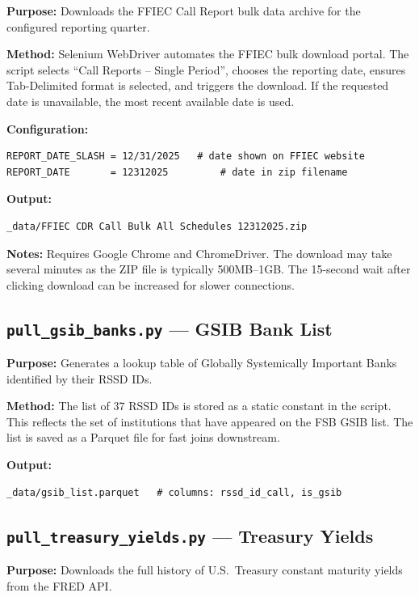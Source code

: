 \documentclass[12pt, a4paper]{article}
\begin{document}
\textbf{Purpose:} Downloads the FFIEC Call Report bulk data archive for the
configured reporting quarter.

\textbf{Method:} Selenium WebDriver automates the FFIEC bulk download portal.
The script selects ``Call Reports -- Single Period'', chooses the reporting date,
ensures Tab-Delimited format is selected, and triggers the download. If the
requested date is unavailable, the most recent available date is used.

\textbf{Configuration:}
\begin{lstlisting}
REPORT_DATE_SLASH = 12/31/2025   # date shown on FFIEC website
REPORT_DATE       = 12312025         # date in zip filename
\end{lstlisting}

\textbf{Output:}
\begin{lstlisting}
_data/FFIEC CDR Call Bulk All Schedules 12312025.zip
\end{lstlisting}

\textbf{Notes:} Requires Google Chrome and ChromeDriver. The download may take
several minutes as the ZIP file is typically 500MB--1GB. The 15-second wait
after clicking download can be increased for slower connections.

\subsection{\texttt{pull\_gsib\_banks.py} --- GSIB Bank List}

\textbf{Purpose:} Generates a lookup table of Globally Systemically Important
Banks identified by their RSSD IDs.

\textbf{Method:} The list of 37 RSSD IDs is stored as a static constant in the
script. This reflects the set of institutions that have appeared on the FSB
GSIB list. The list is saved as a Parquet file for fast joins downstream.

\textbf{Output:}
\begin{lstlisting}
_data/gsib_list.parquet   # columns: rssd_id_call, is_gsib
\end{lstlisting}

\subsection{\texttt{pull\_treasury\_yields.py} --- Treasury Yields}

\textbf{Purpose:} Downloads the full history of U.S.\ Treasury constant
maturity yields from the FRED API.
\end{document}
